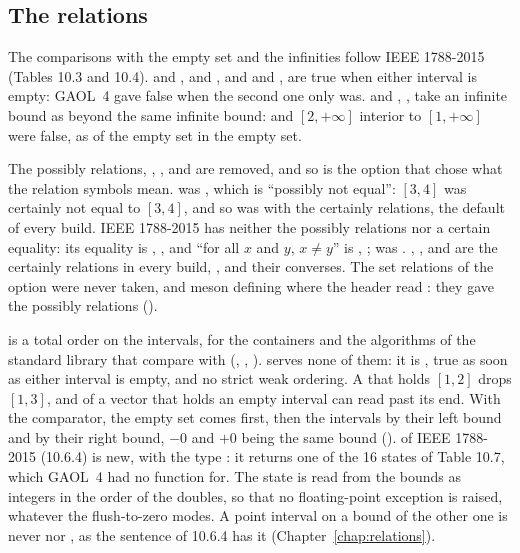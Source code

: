 \documentclass[12pt,a4paper,twoside,openright]{book}
\begin{document}
\subsection{The relations}
\label{sec:changes-relations}
%

The comparisons with the empty set and the infinities follow IEEE 1788-2015
(Tables 10.3 and 10.4).\newinvfive{}  and
,  and , and
 and , are true when either
interval is empty: GAOL~4 gave false when the second one only was.
 and , , take
an infinite bound as beyond the same infinite bound:
 and $[2, +\infty]$ interior to $[1, +\infty]$
were false, as  of the empty set in the empty set.

\medskip
The possibly relations, , ,
\code{==} and \code{!=} are removed, and so is the option that chose what the
relation symbols mean.\newinvfive{}  was
, which is ``possibly not equal'': $[3, 4]$ was
certainly not equal to $[3, 4]$, and so was \code{!=} with the certainly
relations, the default of every build. IEEE 1788-2015 has neither the
possibly relations nor a certain equality: its equality is ,
, and ``for all $x$ and $y$, $x \neq y$'' is
, ;  was
. \code{<}, \code{<=}, \code{>} and \code{>=} are
the certainly relations in every build, ,
 and their converses. The set relations of the option were
never taken,  and meson defining 
where the header read : they gave the possibly
relations ().

\medskip
{} is a total order on the intervals, for the
containers and the algorithms of the standard library that compare with
\code{<} (, , ).\newinvfive{}
\code{<} serves none of them: it is , true as soon as
either interval is empty, and no strict weak ordering. A
 that holds $[1, 2]$ drops $[1, 3]$, and
 of a vector that holds an empty interval can read past its
end. With the comparator, the empty set comes first, then the intervals by
their left bound and by their right bound, $-0$ and $+0$ being the same bound
().  of IEEE 1788-2015
(10.6.4) is new, with the type : it returns one of
the 16 states of Table 10.7, which GAOL~4 had no function for. The state is
read from the bounds as integers in the order of the doubles, so that no
floating-point exception is raised, whatever the flush-to-zero modes. A point
interval on a bound of the other one is never  nor
, as the sentence of 10.6.4 has it
(Chapter~\ref{chap:relations}).
\end{document}
